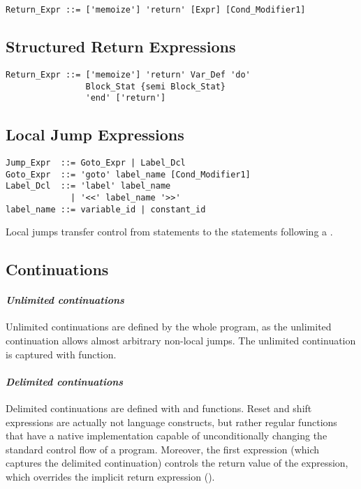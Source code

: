 \syntax\begin{lstlisting}
Return_Expr ::= ['memoize'] 'return' [Expr] [Cond_Modifier1]
\end{lstlisting}






\subsection{Structured Return Expressions}

\syntax\begin{lstlisting}
Return_Expr ::= ['memoize'] 'return' Var_Def 'do' 
                Block_Stat {semi Block_Stat} 
                'end' ['return']
\end{lstlisting}






\subsection{Local Jump Expressions}

\syntax\begin{lstlisting}
Jump_Expr  ::= Goto_Expr | Label_Dcl
Goto_Expr  ::= 'goto' label_name [Cond_Modifier1]
Label_Dcl  ::= 'label' label_name 
             | '<<' label_name '>>'
label_name ::= variable_id | constant_id
\end{lstlisting}

Local jumps transfer control from  statements to the statements following a . 


\subsection{Continuations}

\paragraph{\em Unlimited continuations}
Unlimited continuations are defined by the whole program, as the unlimited continuation allows almost arbitrary non-local jumps. The unlimited continuation is captured with  function. 

\paragraph{\em Delimited continuations}
Delimited continuations are defined with  and  functions. Reset and shift expressions are actually not language constructs, but rather regular functions that have a native implementation capable of unconditionally changing the standard control flow of a program. Moreover, the first  expression (which captures the delimited continuation) controls the return value of the  expression, which overrides the implicit return expression ().








